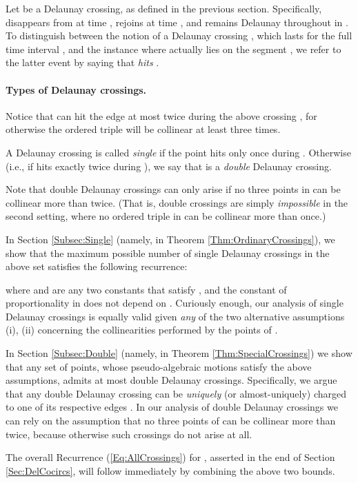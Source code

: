 \documentclass[letter,11pt]{article}
\begin{document}
  
Let  be a Delaunay crossing, as defined in the previous section. Specifically,  disappears from  at time , rejoins  at time , and remains Delaunay throughout  in . To distinguish between the notion of a Delaunay crossing , which lasts for the full time interval , and the instance where  actually lies on the segment , we refer to the latter event by saying that  {\it hits} .

\paragraph{Types of Delaunay crossings.}
Notice that  can hit the edge  at most twice during the above crossing , for otherwise the ordered triple  will be collinear at least three times.

A Delaunay crossing  is called {\it single} if the point  hits  only once during .
Otherwise (i.e., if  hits  exactly twice during ), we say that  is a {\it double} Delaunay crossing. 

Note that double Delaunay crossings can only arise if no three points in  can be collinear more than twice. (That is, double crossings are simply {\it impossible} in the second setting, where no ordered triple in  can be collinear more than once.)

In Section \ref{Subsec:Single} (namely, in Theorem \ref{Thm:OrdinaryCrossings}), we show that the maximum possible number  of single Delaunay crossings in the above set  satisfies the following recurrence:


where  and  are any two constants that satisfy , and the constant of proportionality in  does not depend on . Curiously enough, our analysis of single Delaunay crossings is equally valid given {\it any} of the two alternative assumptions (i), (ii) concerning the collinearities performed by the points of .

In Section \ref{Subsec:Double} (namely, in Theorem \ref{Thm:SpecialCrossings}) we show that any set  of  points, whose pseudo-algebraic motions satisfy the above assumptions, admits at most  double Delaunay crossings. Specifically, we argue that any double Delaunay crossing  can be {\it uniquely} (or almost-uniquely) charged to one of its respective edges .
In our analysis of double Delaunay crossings we can rely on the assumption that no three points of  can be collinear more than twice, because otherwise such crossings do not arise at all.

The overall Recurrence (\ref{Eq:AllCrossings}) for , asserted in the end of Section \ref{Sec:DelCocircs}, will follow immediately by combining the above two bounds.
\end{document}
